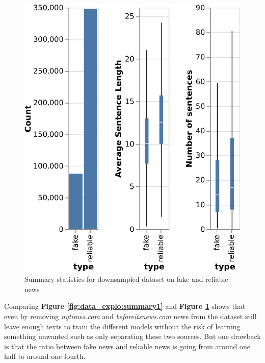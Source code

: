 \begin{figure}[h]
 \centering
 \includegraphics{images/data_exploration/downsampled.eps}
 \caption{Summary statistics for downsampled dataset on fake and reliable news}
 \label{fig:data_explo:summary2}
\end{figure}
Comparing \textbf{Figure \ref{fig:data_explo:summary1}} and \textbf{Figure \ref{fig:data_explo:summary2}} shows that even by removing \textit{nytimes.com} and \textit{beforeitsnews.com} news from the dataset still leave enough texts to train the different models without the risk of learning something unwanted such as only separating these two sources. But one drawback is that the ratio between fake news and reliable news is going from around one half to around one fourth. 

